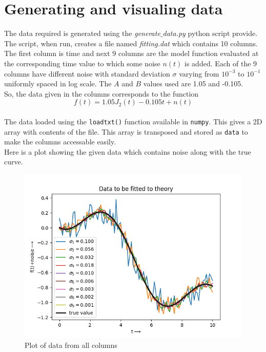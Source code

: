 \documentclass[12pt, a4paper]{report}
\begin{document}
\section*{Generating and visualing data}
 The data required is generated using the \textit{generate$\_$data.py} python script provide. The script, when run, creates a file named \textit{fitting.dat} which contains 10 columns. The first column is time and next 9 columns are the model function evaluated at the corresponding time value to which some noise $n(t)$ is added. Each of the 9 columns have different noise with standard deviation $\sigma$ varying from $10^{-3}$ to $10^{-1}$ uniformly spaced in log scale. The $A$ and $B$ values used are 1.05 and -0.105.\\
 So, the data given in the columns corresponds to the function
 \begin{equation*}
 f(t) = 1.05J_2(t)-0.105t+n(t)
 \end{equation*} \\
 The data loaded using the \texttt{loadtxt()} function available in \texttt{numpy}. This gives a 2D array with contents of the file. This array is transposed and stored as \texttt{data} to make the columns accessable easily.\\
 Here is a plot showing the given data which contains noise along with the true curve.
 \begin{figure}[H]
 \centering
	\includegraphics[scale=0.8]{Figure_1.png}  %
	\caption{Plot of data from all columns}
	\label{fig1: Plot of data from all columns}
 \end{figure}
 
\end{document}
